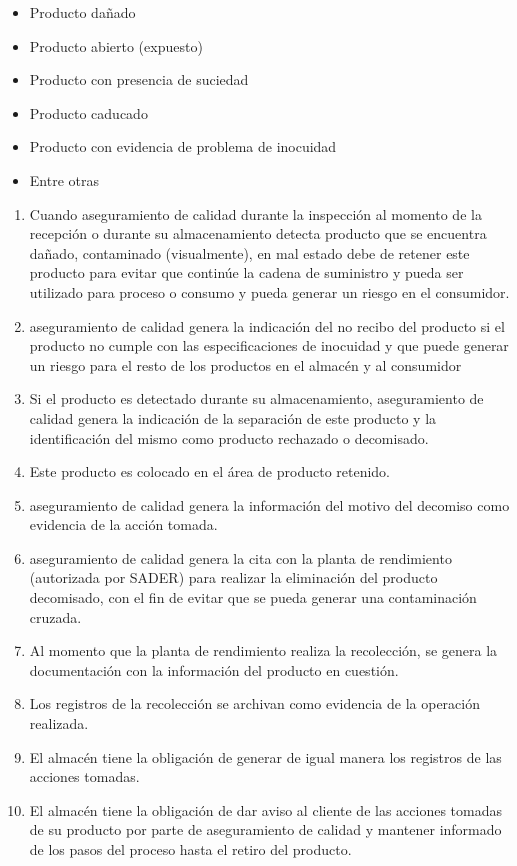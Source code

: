 \begin{itemize}
	\item Producto dañado
	\item Producto abierto (expuesto)
	\item Producto con presencia de suciedad
	\item Producto caducado
	\item Producto con evidencia de problema de inocuidad
	\item Entre otras
\end{itemize}

\begin{enumerate}
	\item Cuando aseguramiento de calidad durante la inspección al momento de la recepción o durante su almacenamiento detecta producto que se encuentra dañado, contaminado (visualmente), en mal estado debe de retener este producto para evitar que continúe la cadena de suministro y pueda ser utilizado para proceso o consumo y pueda generar un riesgo en el consumidor.
	\item aseguramiento de calidad genera la indicación del no recibo del producto si el producto no cumple con las especificaciones de inocuidad y que puede generar un riesgo para el resto de los productos en el almacén y al consumidor
	\item Si el producto es detectado durante su almacenamiento, aseguramiento de calidad genera la indicación de la separación de este producto y la identificación del mismo como producto rechazado o decomisado.
	\item Este producto es colocado en el área de producto retenido.
	\item aseguramiento de calidad genera la información del motivo del decomiso como evidencia de la acción tomada.
	\item aseguramiento de calidad genera la cita con la planta de rendimiento (autorizada por SADER) para realizar la eliminación del producto decomisado, con el fin de evitar que se pueda generar una contaminación cruzada.
	\item Al momento que la planta de rendimiento realiza la recolección, se genera la documentación con la información del producto en cuestión.
	\item Los registros de la recolección se archivan como evidencia de la operación realizada.
	\item El almacén tiene la obligación de generar de igual manera los registros de las acciones tomadas.
	\item El almacén tiene la obligación de dar aviso al cliente de las acciones tomadas de su producto por parte de aseguramiento de calidad y mantener informado de los pasos del proceso hasta el retiro del producto.
\end{enumerate}


